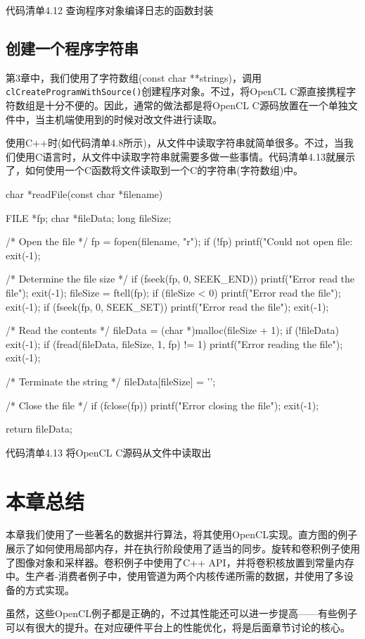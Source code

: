 代码清单4.12 查询程序对象编译日志的函数封装

\subsection{创建一个程序字符串}

第3章中，我们使用了字符数组(const char **strings)，调用\texttt{clCreateProgramWithSource()}创建程序对象。不过，将OpenCL C源直接携程字符数组是十分不便的。因此，通常的做法都是将OpenCL C源码放置在一个单独文件中，当主机端使用到的时候对改文件进行读取。

使用C++时(如代码清单4.8所示)，从文件中读取字符串就简单很多。不过，当我们使用C语言时，从文件中读取字符串就需要多做一些事情。代码清单4.13就展示了，如何使用一个C函数将文件读取到一个C的字符串(字符数组)中。

\begin{codebox}[cpp]
char *readFile(const char *filename)
{
  FILE *fp;
  char *fileData;
  long fileSize;

  /* Open the file */
  fp = fopen(filename, "r");
  if (!fp){
    printf("Could not open file: %
    exit(-1);
  }

  /* Determine the file size */
  if (fseek(fp, 0, SEEK_END)){
    printf("Error read the file\n");
    exit(-1);
  }
  fileSize = ftell(fp);
  if (fileSize < 0){
    printf("Error read the file\n");
    exit(-1);
  }
  if (fseek(fp, 0, SEEK_SET)){
    printf("Error read the file\n");
    exit(-1);
  }

  /* Read the contents */
  fileData = (char *)malloc(fileSize + 1);
  if (!fileData){
    exit(-1);
  }
  if (fread(fileData, fileSize, 1, fp) != 1){
    printf("Error reading the file\n");
    exit(-1);
  }

  /* Terminate the string */
  fileData[fileSize] = '\0';

  /* Close the file */
  if (fclose(fp)){
    printf("Error closing the file\n");
    exit(-1);
  }

  return fileData;
}
\end{codebox}

代码清单4.13 将OpenCL C源码从文件中读取出



\section{本章总结}

本章我们使用了一些著名的数据并行算法，将其使用OpenCL实现。直方图的例子展示了如何使用局部内存，并在执行阶段使用了适当的同步。旋转和卷积例子使用了图像对象和采样器。卷积例子中使用了C++ API，并将卷积核放置到常量内存中。生产者-消费者例子中，使用管道为两个内核传递所需的数据，并使用了多设备的方式实现。

虽然，这些OpenCL例子都是正确的，不过其性能还可以进一步提高——有些例子可以有很大的提升。在对应硬件平台上的性能优化，将是后面章节讨论的核心。


